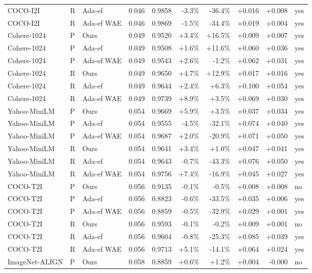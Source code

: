 \begin{tabular}{lllrrrrrrl}
COCO-I2I & R & Ada-ef & 0.046 & 0.9858 & -3.3\% & -36.4\% & +0.016 & +0.008 & yes \\
COCO-I2I & R & Ada-ef WAE & 0.046 & 0.9869 & -1.5\% & -34.4\% & +0.019 & +0.004 & yes \\
Cohere-1024 & P & Ours & 0.049 & 0.9520 & +3.4\% & +16.5\% & +0.009 & +0.007 & yes \\
Cohere-1024 & P & Ada-ef & 0.049 & 0.9508 & +1.6\% & +11.6\% & +0.060 & +0.036 & yes \\
Cohere-1024 & P & Ada-ef WAE & 0.049 & 0.9543 & +2.6\% & -1.2\% & +0.062 & +0.031 & yes \\
Cohere-1024 & R & Ours & 0.049 & 0.9650 & +4.7\% & +12.9\% & +0.017 & +0.016 & yes \\
Cohere-1024 & R & Ada-ef & 0.049 & 0.9644 & +2.4\% & +6.3\% & +0.100 & +0.054 & yes \\
Cohere-1024 & R & Ada-ef WAE & 0.049 & 0.9739 & +8.9\% & +3.5\% & +0.069 & +0.030 & yes \\
Yahoo-MiniLM & P & Ours & 0.054 & 0.9669 & +5.9\% & +3.5\% & +0.037 & +0.034 & yes \\
Yahoo-MiniLM & P & Ada-ef & 0.054 & 0.9555 & -4.5\% & -32.1\% & +0.074 & +0.040 & yes \\
Yahoo-MiniLM & P & Ada-ef WAE & 0.054 & 0.9687 & +2.0\% & -20.9\% & +0.071 & +0.050 & yes \\
Yahoo-MiniLM & R & Ours & 0.054 & 0.9641 & +3.4\% & +1.0\% & +0.047 & +0.041 & yes \\
Yahoo-MiniLM & R & Ada-ef & 0.054 & 0.9643 & -0.7\% & -43.3\% & +0.076 & +0.050 & yes \\
Yahoo-MiniLM & R & Ada-ef WAE & 0.054 & 0.9756 & +7.4\% & -16.9\% & +0.045 & +0.027 & yes \\
COCO-T2I & P & Ours & 0.056 & 0.9135 & -0.1\% & -0.5\% & +0.008 & +0.008 & no \\
COCO-T2I & P & Ada-ef & 0.056 & 0.8823 & -0.6\% & -33.5\% & +0.035 & +0.006 & yes \\
COCO-T2I & P & Ada-ef WAE & 0.056 & 0.8859 & -0.5\% & -32.9\% & +0.029 & +0.001 & yes \\
COCO-T2I & R & Ours & 0.056 & 0.9593 & -0.1\% & -0.2\% & +0.009 & +0.001 & no \\
COCO-T2I & R & Ada-ef & 0.056 & 0.9604 & -0.8\% & -25.3\% & +0.085 & +0.039 & yes \\
COCO-T2I & R & Ada-ef WAE & 0.056 & 0.9713 & +5.1\% & -14.1\% & +0.064 & +0.024 & yes \\
ImageNet-ALIGN & P & Ours & 0.058 & 0.8859 & +0.6\% & +1.2\% & +0.004 & -0.000 & no \\

\end{tabular}
